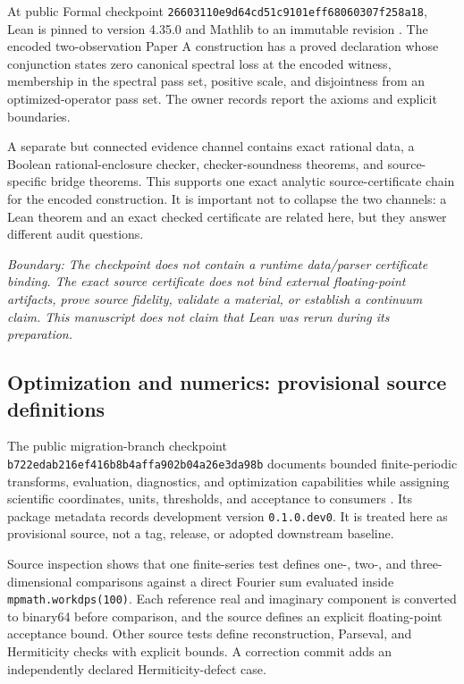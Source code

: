 \documentclass[11pt]{article}
\newcommand{\nonclaim}[1]{\textit{Boundary: #1}}
\begin{document}
At public Formal checkpoint
\texttt{26603110e9d64cd51c9101eff68060307f258a18}, Lean is pinned to
version 4.35.0 and Mathlib to an immutable revision
\citep{projectkoios_formal_2026}. The encoded two-observation Paper A
construction has a proved declaration whose conjunction states zero canonical
spectral loss at the encoded witness, membership in the spectral pass set,
positive scale, and disjointness from an optimized-operator pass set. The owner
records report the axioms and explicit boundaries.

A separate but connected evidence channel contains exact rational data, a
Boolean rational-enclosure checker, checker-soundness theorems, and
source-specific bridge theorems. This supports one exact analytic
source-certificate chain for the encoded construction. It is important not to
collapse the two channels: a Lean theorem and an exact checked certificate are
related here, but they answer different audit questions.

\nonclaim{The checkpoint does not contain a runtime data/parser certificate
binding. The exact source certificate does not bind external floating-point
artifacts, prove source fidelity, validate a material, or establish a continuum
claim. This manuscript does not claim that Lean was rerun during its
preparation.}

\subsection{Optimization and numerics: provisional source definitions}

The public migration-branch checkpoint
\texttt{b722edab216ef416b8b4affa902b04a26e3da98b} documents bounded
finite-periodic transforms, evaluation, diagnostics, and optimization
capabilities while assigning scientific coordinates, units, thresholds, and
acceptance to consumers \citep{projectkoios_optimization_2026}. Its package
metadata records development version \texttt{0.1.0.dev0}. It is treated here as
provisional source, not a tag, release, or adopted downstream baseline.

Source inspection shows that one finite-series test defines one-, two-, and
three-dimensional comparisons against a direct Fourier sum evaluated inside
\texttt{mpmath.workdps(100)}. Each reference real and imaginary component is
converted to binary64 before comparison, and the source defines an explicit
floating-point acceptance bound. Other source tests define reconstruction,
Parseval, and Hermiticity checks with explicit bounds. A correction commit adds
an independently declared Hermiticity-defect case.
\end{document}

